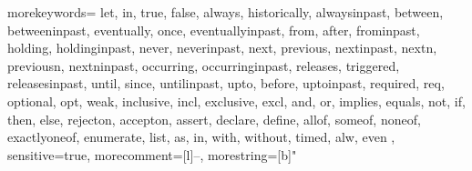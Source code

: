 \newcommand{\dual}[1]{\overline{#1}}


\renewcommand{\phi}{\varphi}
\newcommand{\nphi}{{\neg\phi}}

\newcommand{\monitor}{\ensuremath{{\sf monitor}}\xspace}
\newcommand{\step}{\ensuremath{{\sf step}}\xspace}
\newcommand{\decide}{\ensuremath{{\sf decide}}\xspace}

\newcommand{\emptiness}{\ensuremath{\text{\sf non-empty}}\xspace}

\newcommand{\extrapolate}{\ensuremath{{\sf extrapolate}}\xspace}
\newcommand{\abstractfct}{\ensuremath{\alpha}}

{morekeywords={
  let, in, true, false,
  always, historically, alwaysinpast,
  between, betweeninpast,
  eventually, once, eventuallyinpast,
  from, after, frominpast,
  holding, holdinginpast,
  never, neverinpast,
  next, previous, nextinpast,
  nextn, previousn, nextninpast,
  occurring, occurringinpast,
  releases, triggered, releasesinpast,
  until, since, untilinpast,
  upto, before, uptoinpast,
  required, req, optional, opt, weak,
  inclusive, incl, exclusive, excl,
  and, or, implies, equals, not,
  if, then, else,
  rejecton, accepton,
  assert, declare, define,
  allof, someof, noneof, exactlyoneof,
  enumerate, list, as, in,
  with, without,
  timed,
  alw, even  %
},
sensitive=true,
morecomment=[l]{--},
morestring=[b]"
}

